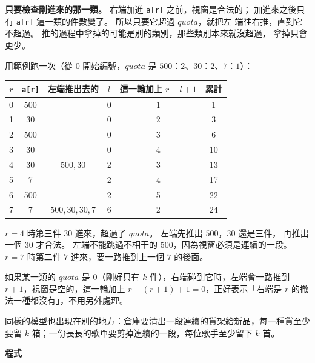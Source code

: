 \textbf{只要檢查剛進來的那一類。} 右端加進 \texttt{a[r]} 之前，視窗是合法的；
加進來之後只有 \texttt{a[r]} 這一類的件數變了。 所以只要它超過 $quota$，就把左
端往右推，直到它不超過。 推的過程中拿掉的可能是別的類別，那些類別本來就沒超過，
拿掉只會更少。

用範例跑一次（從 $0$ 開始編號，$quota$ 是 $500$：$2$、$30$：$2$、$7$：$1$）：

\begin{center}
\begin{tabular}{ccccc c}
\toprule
$r$ & \texttt{a[r]} & 左端推出去的 & $l$ & 這一輪加上 $r - l + 1$ & 累計 \\
\midrule
0 & 500 & & 0 & 1 & 1 \\
1 & 30 & & 0 & 2 & 3 \\
2 & 500 & & 0 & 3 & 6 \\
3 & 30 & & 0 & 4 & 10 \\
4 & 30 & $500, 30$ & 2 & 3 & 13 \\
5 & 7 & & 2 & 4 & 17 \\
6 & 500 & & 2 & 5 & 22 \\
7 & 7 & $500, 30, 30, 7$ & 6 & 2 & 24 \\
\bottomrule
\end{tabular}
\end{center}

$r = 4$ 時第三件 $30$ 進來，超過了 $quota$。 左端先推出 $500$，$30$ 還是三件，
再推出一個 $30$ 才合法。 左端不能跳過不相干的 $500$，因為視窗必須是連續的一段。
$r = 7$ 時第二件 $7$ 進來，要一路推到上一個 $7$ 的後面。

如果某一類的 $quota$ 是 $0$（剛好只有 $k$ 件），右端碰到它時，左端會一路推到
$r + 1$，視窗是空的，這一輪加上 $r - (r + 1) + 1 = 0$，正好表示「右端是 $r$
的撤法一種都沒有」，不用另外處理。

同樣的模型也出現在別的地方：倉庫要清出一段連續的貨架給新品，每一種貨至少要留
$k$ 箱；一份長長的歌單要剪掉連續的一段，每位歌手至少留下 $k$ 首。

\textbf{程式}

